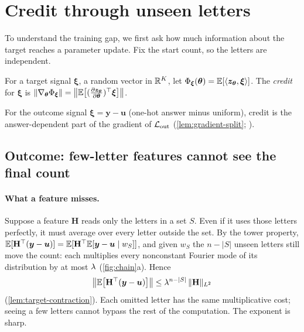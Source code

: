 \section{Credit through unseen letters}
\label{sec:credit}

To understand the training gap, we first ask how much information about the target reaches a parameter update.
Fix the start count, so the letters are independent.

\begin{definition}[Credit]
\label{def:credit}
For a target signal $\bm\xi$, a random vector in $\mathbb R^K$, let $\Phi_{\bm\xi}(\bm\theta)=\mathbb E[\langle\bm z_{\bm\theta},\bm\xi\rangle]$. The
\emph{credit} for $\bm\xi$ is $\|\nabla_{\bm\theta}\cred_{\bm\xi}\|=\bigl\|\E\bigl[(\Jz)^\top\bm\xi\bigr]\bigr\|$.
\end{definition}

For the outcome signal $\bm\xi=\bm y-\bm u$ (one-hot answer minus uniform), credit is the answer-dependent part of the gradient of
$\mathcal L_{\mathrm{out}}$ (\cref{lem:gradient-split}; \citealp{shalevshwartz2017failures,abbe2025parities}).

\subsection{Outcome: few-letter features cannot see the final count}
\paragraph{What a feature misses.} Suppose a feature $\mathbf H$ reads only the letters in a set $S$. Even if it uses those letters perfectly,
it must average over every letter outside the set. By the tower property,
$\mathbb E[\mathbf H^\top(\bm y-\bm u)]=\mathbb E[\mathbf H^\top\mathbb E[\bm y-\bm u\mid w_S]]$, and given $w_S$ the $n-|S|$ unseen letters still move the count: each
multiplies every nonconstant Fourier mode of its distribution by at most $\lambda$ (\cref{fig:chain}a). Hence
\begin{equation}
 \bigl\|\mathbb E\bigl[\mathbf H^\top(\bm y-\bm u)\bigr]\bigr\|\le\lambda^{n-|S|}\,\|\mathbf H\|_{L^2}
 \label{eq:credit-degree}
\end{equation}
(\cref{lem:target-contraction}). Each omitted letter has the same multiplicative cost; seeing a few letters cannot bypass the rest of
the computation. The exponent is sharp.

